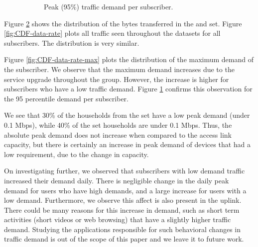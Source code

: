 \begin{figure}[t]
\begin{minipage}{1\linewidth}
\begin{subfigure}[b]{0.33\linewidth}
               \caption{Peak (95\%)
traffic demand per subscriber.\label{fig:CDF-data-rate-perc95}}
\end{subfigure}
%
\end{minipage}
\caption{\label{fig:traffic-demand-cdf}}
\end{figure}


Figure \ref{fig:traffic-demand-cdf} shows the distribution of the
bytes transferred in the \treatment{} and \control{} set. Figure 
\ref{fig:CDF-data-rate}
plots all traffic seen throughout the datasets for all subscribers. The
distribution is very similar.

Figure \ref{fig:CDF-data-rate-max} plots the distribution of the
maximum demand of the subscriber. We observe that the maximum demand increases 
due 
to the service upgrade throughout the \control{} group. However, the increase is 
higher for
subscribers who have a low traffic demand. Figure \ref{fig:CDF-data-rate-perc95} 
confirms this
observation for the 95 percentile demand per subscriber.

We see that 30\% of the households from the \test set have a low 
peak demand (under 0.1 Mbps), while 40\% of the \control set households 
are under 0.1 Mbps. Thus, the absolute peak demand does not increase when 
compared to the access link capacity, but there is certainly an increase in 
peak demand of devices that had a low requirement, due to the change in 
capacity.

On investigating further, we observed that subscribers with low demand traffic 
increased their demand daily. There is negligible change in the daily peak 
demand for users
who have high demands, and a large increase for users with a low demand.
Furthermore, we observe this affect is also present in the uplink.
There could be many reasons for this increase in 
demand, such as short term activities (short videos or web browsing) 
that have a slightly higher traffic demand. Studying the applications 
responsible for such behavioral changes in traffic demand is out of the
scope of this paper and we leave it to future work.